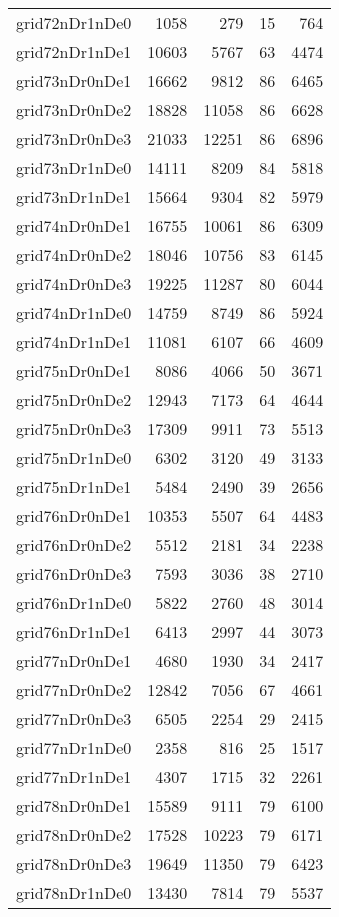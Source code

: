 \begin{longtable}{lrrrr}
grid72nDr1nDe0 & 1058 & 279 & 15 & 764 \\
grid72nDr1nDe1 & 10603 & 5767 & 63 & 4474 \\
grid73nDr0nDe1 & 16662 & 9812 & 86 & 6465 \\
grid73nDr0nDe2 & 18828 & 11058 & 86 & 6628 \\
grid73nDr0nDe3 & 21033 & 12251 & 86 & 6896 \\
grid73nDr1nDe0 & 14111 & 8209 & 84 & 5818 \\
grid73nDr1nDe1 & 15664 & 9304 & 82 & 5979 \\
grid74nDr0nDe1 & 16755 & 10061 & 86 & 6309 \\
grid74nDr0nDe2 & 18046 & 10756 & 83 & 6145 \\
grid74nDr0nDe3 & 19225 & 11287 & 80 & 6044 \\
grid74nDr1nDe0 & 14759 & 8749 & 86 & 5924 \\
grid74nDr1nDe1 & 11081 & 6107 & 66 & 4609 \\
grid75nDr0nDe1 & 8086 & 4066 & 50 & 3671 \\
grid75nDr0nDe2 & 12943 & 7173 & 64 & 4644 \\
grid75nDr0nDe3 & 17309 & 9911 & 73 & 5513 \\
grid75nDr1nDe0 & 6302 & 3120 & 49 & 3133 \\
grid75nDr1nDe1 & 5484 & 2490 & 39 & 2656 \\
grid76nDr0nDe1 & 10353 & 5507 & 64 & 4483 \\
grid76nDr0nDe2 & 5512 & 2181 & 34 & 2238 \\
grid76nDr0nDe3 & 7593 & 3036 & 38 & 2710 \\
grid76nDr1nDe0 & 5822 & 2760 & 48 & 3014 \\
grid76nDr1nDe1 & 6413 & 2997 & 44 & 3073 \\
grid77nDr0nDe1 & 4680 & 1930 & 34 & 2417 \\
grid77nDr0nDe2 & 12842 & 7056 & 67 & 4661 \\
grid77nDr0nDe3 & 6505 & 2254 & 29 & 2415 \\
grid77nDr1nDe0 & 2358 & 816 & 25 & 1517 \\
grid77nDr1nDe1 & 4307 & 1715 & 32 & 2261 \\
grid78nDr0nDe1 & 15589 & 9111 & 79 & 6100 \\
grid78nDr0nDe2 & 17528 & 10223 & 79 & 6171 \\
grid78nDr0nDe3 & 19649 & 11350 & 79 & 6423 \\
grid78nDr1nDe0 & 13430 & 7814 & 79 & 5537 \\

\end{longtable}
